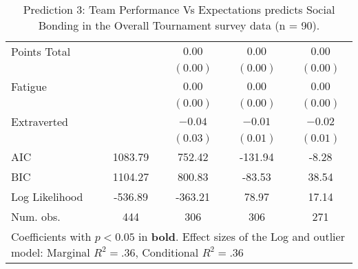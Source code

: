 \begin{table}
\begin{center}
\begin{tabular}{l c c c c }
Points Total                      &                       & $0.00$                & $0.00$                & $0.00$                \\
                                  &                       & $(0.00)$              & $(0.00)$              & $(0.00)$              \\
Fatigue                           &                       & $0.00$                & $0.00$                & $0.00$                \\
                                  &                       & $(0.00)$              & $(0.00)$              & $(0.00)$              \\
Extraverted                       &                       & $-0.04$               & $-0.01$               & $-0.02$               \\
                                  &                       & $(0.03)$              & $(0.01)$              & $(0.01)$              \\
\midrule
AIC                               & 1083.79               & 752.42                & -131.94               & -8.28                 \\
BIC                               & 1104.27               & 800.83                & -83.53                & 38.54                 \\
Log Likelihood                    & -536.89               & -363.21               & 78.97                 & 17.14                 \\
Num. obs.                         & 444                   & 306                   & 306                   & 271                   \\
\bottomrule
\multicolumn{5}{l}{\scriptsize{Coefficients with $p < 0.05$ in \textbf{bold}. Effect sizes of the Log and outlier model: Marginal $R^2 = .36$, Conditional $R^2 = .36$}}
\end{tabular}
\caption{Prediction 3: Team Performance Vs Expectations predicts Social Bonding in the Overall Tournament survey data (n = 90).}
\label{tab:MLM32ateamPerfBondingTournament}
\end{center}
\end{table}
